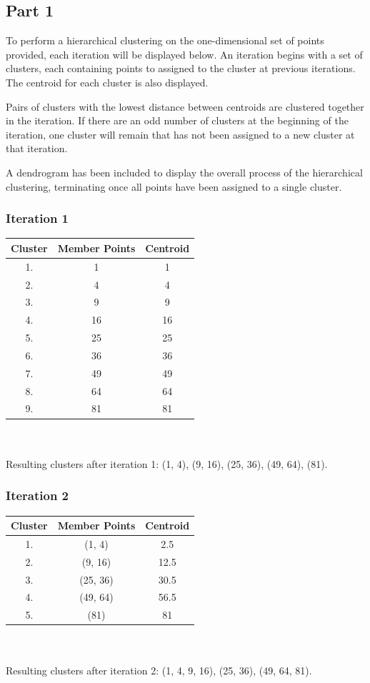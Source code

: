 \documentclass[12t]{article}
\begin{document}
	\subsection*{Part 1}
	
	To perform a hierarchical clustering on the one-dimensional set of points provided, each iteration will be displayed below. An iteration begins with a set of clusters, each containing points to assigned to the cluster at previous iterations. The centroid for each cluster is also displayed. 	
	
	Pairs of clusters with the lowest distance between centroids are clustered together in the iteration. If there are an odd number of clusters at the beginning of the iteration, one cluster will remain that has not been assigned to a new cluster at that iteration.
	
	A dendrogram has been included to display the overall process of the hierarchical clustering, terminating once all points have been assigned to a single cluster. 
	
	\subsubsection*{Iteration 1}

	\begin{tabular}{ccc}
	Cluster & Member Points & Centroid \\
	\hline
  	1. & 1 & 1 \\
 	2. & 4 & 4 \\
 	3. & 9 & 9 \\
 	4. & 16 & 16 \\
 	5. & 25 & 25 \\
 	6. & 36 & 36 \\
 	7. & 49 & 49 \\
 	8. & 64 & 64 \\
  	9. & 81 & 81 \\
	\hline 
	\end{tabular} \\\\
	Resulting clusters after iteration 1: (1, 4), (9, 16), (25, 36), (49, 64), (81).
	
	\subsubsection*{Iteration 2}

	\begin{tabular}{ccc}
	Cluster & Member Points & Centroid \\
	\hline
  	1. & (1, 4) & 2.5 \\
 	2. & (9, 16) & 12.5 \\
 	3. & (25, 36) & 30.5 \\
 	4. & (49, 64) & 56.5 \\
 	5. & (81) & 81 \\
	\hline 
	\end{tabular} \\\\
	Resulting clusters after iteration 2: (1, 4, 9, 16), (25, 36), (49, 64, 81).
	
\end{document}
